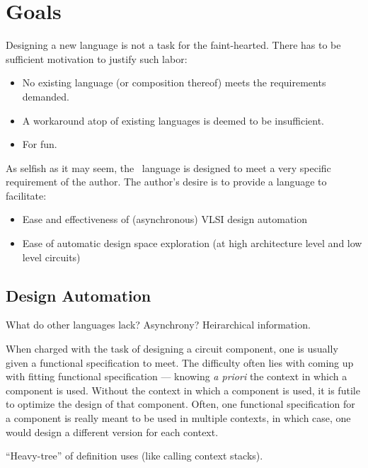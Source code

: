 
\chapter{Goals}
\label{sec:goals}

Designing a new language is not a task for the faint-hearted.  
There has to be sufficient motivation to justify such labor:

\begin{itemize}
\item No existing language (or composition thereof)
	meets the requirements demanded.  
\item A workaround atop of existing languages is deemed to be insufficient.
\item For fun.  
\end{itemize}

As selfish as it may seem, the \artxx\ language is designed to meet a very
specific requirement of the author.  
The author's desire is to provide a language to facilitate:

\begin{itemize}
\item Ease and effectiveness of (asynchronous) VLSI design automation
\item Ease of automatic design space exploration 
	(at high architecture level and low level circuits)
\end{itemize}

\section{Design Automation}
\label{sec:goals:EDA}

What do other languages lack?
Asynchrony?
Heirarchical information.  

When charged with the task of designing a circuit component, 
one is usually given a functional specification to meet.  
The difficulty often lies with coming up with fitting 
functional specification ---
knowing \emph{a priori} the context in which a component is used.  
Without the context in which a component is used, 
it is futile to optimize the design of that component.  
Often, one functional specification for a component is really 
meant to be used in multiple contexts, in which case, 
one would design a different version for each context.  

``Heavy-tree'' of definition uses (like calling context stacks).  

